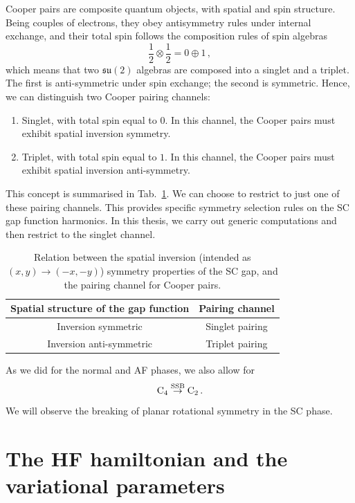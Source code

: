 Cooper pairs are composite quantum objects, with spatial and spin structure. Being couples of electrons, they obey antisymmetry rules under internal exchange, and their total spin follows the composition rules of spin algebras
\[
	\frac 1 2 \otimes \frac 1 2 = 0 \oplus 1 \, ,
\]
which means that two $\mathfrak{su}(2)$ algebras are composed into a singlet and a triplet. The first is anti-symmetric under spin exchange; the second is symmetric. Hence, we can distinguish two Cooper pairing channels:
\begin{enumerate}
	\item Singlet, with total spin equal to $0$. In this channel, the Cooper pairs must exhibit spatial inversion symmetry.
	\item Triplet, with total spin equal to $1$. In this channel, the Cooper pairs must exhibit spatial inversion anti-symmetry.
\end{enumerate}
This concept is summarised in Tab.~\ref{tab:sc-pairings-symmetry-structures}. We can choose to restrict to just one of these pairing channels. This provides specific symmetry selection rules on the SC gap function harmonics. In this thesis, we carry out generic computations and then restrict to the singlet channel.

\begin{table}
	\centering
	\begin{tabular}{c c}
		\textbf{Spatial structure of the gap function} & \textbf{Pairing channel} \\
		\midrule
		Inversion symmetric & Singlet pairing \\
		Inversion anti-symmetric & Triplet pairing \\
		\midrule
	\end{tabular}
	\caption{Relation between the spatial inversion (intended as $(x,y) \to (-x,-y)$) symmetry properties of the SC gap, and the pairing channel for Cooper pairs.}
	\label{tab:sc-pairings-symmetry-structures}
\end{table}

As we did for the normal and AF phases, we also allow for
\[
	\mathrm{C}_4 \stackrel{\mathrm{SSB}}{\to} \mathrm{C}_2 \, .
\]
We will observe the breaking of planar rotational symmetry in the SC phase.

\section{The HF hamiltonian and the variational parameters}\label{sec:sc-hf-hfps}

